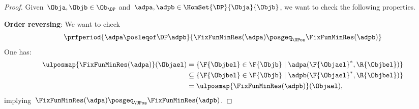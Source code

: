 \begin{proof}
    Given~$\Obja,\Objb \in \Ob_\DP$ and~$\adpa,\adpb \in \HomSet{\DP}{\Obja}{\Objb}$, we want to check the following properties.

    \textbf{Order reversing}:
    We want to check
    \begin{equation*}
        \prfperiod{\adpa \posleqof\DP \adpb}{\FixFunMinRes(\adpa) \posgeq_\UPos \FixFunMinRes(\adpb)}
    \end{equation*}
    One has:
    \begin{equation*}
        \begin{aligned}
            \ulposmap{\FixFunMinRes(\adpa)}(\Objael) & =\{\F{\Objbel} \in \F{\Objb} \mid \adpa(\F{\Objael}^*, \R{\Objbel})\}          \\
                                                     & \subseteq \{\F{\Objbel} \in \F{\Objb} \mid \adpb(\F{\Objael}^*, \R{\Objbel})\} \\
                                                     & = \ulposmap{\FixFunMinRes(\adpb)}(\Objael),
        \end{aligned}
    \end{equation*}
    implying~$\FixFunMinRes(\adpa) \posgeq_\UPos \FixFunMinRes(\adpb)$.


\end{proof}
